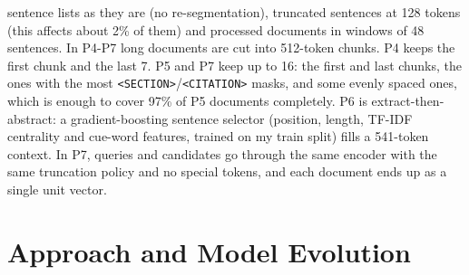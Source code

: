 \documentclass[11pt, oneside]{article}
\begin{document}
sentence lists as they are (no re-segmentation), truncated sentences at 128
tokens (this affects about 2\% of them) and processed documents in windows of
48 sentences. In P4-P7 long documents are cut into 512-token chunks. P4 keeps
the first chunk and the last 7. P5 and P7 keep up to 16: the first and last
chunks, the ones with the most \texttt{<SECTION>}/\texttt{<CITATION>} masks,
and some evenly spaced ones, which is enough to cover 97\% of P5 documents
completely. P6 is extract-then-abstract: a gradient-boosting sentence selector
(position, length, TF-IDF centrality and cue-word features, trained on my train
split) fills a 541-token context. In P7, queries and candidates go through the
same encoder with the same truncation policy and no special tokens, and each
document ends up as a single unit vector.

\section{Approach and Model Evolution}
\end{document}
